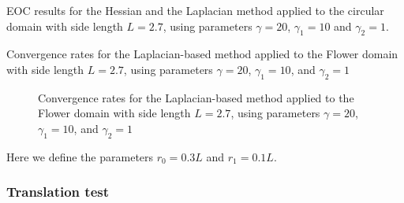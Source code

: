 \begin{table}
\begin{minipage}{1.0\textwidth}
    \centering
    \subfloat[Hessian]{}
\end{minipage}%

\bigskip
\begin{minipage}{1.0\textwidth}
    \centering
    \subfloat[Laplace]{}
\end{minipage}
\caption{EOC results for the Hessian and the Laplacian method applied to the circular domain with side length $L=2.7$, using parameters $\gamma=20$, $\gamma_1=10$ and $\gamma_2=1$.}
\end{table}


\begin{table} 
\caption{Convergence rates for the Laplacian-based method applied to the Flower domain with side length $L=2.7$, using parameters $\gamma=20$, $\gamma_1=10$, and $\gamma_2=1$}
\end{table}
\begin{figure}

\caption{Convergence rates for the Laplacian-based method applied to the Flower domain with side length $L=2.7$, using parameters $\gamma=20$, $\gamma_1=10$, and $\gamma_2=1$}
\end{figure}

Here we define the parameters $r_0= 0.3L$ and $ r_1=0.1L$.

\subsubsection{Translation test}%
\label{ssub:translation_test}


